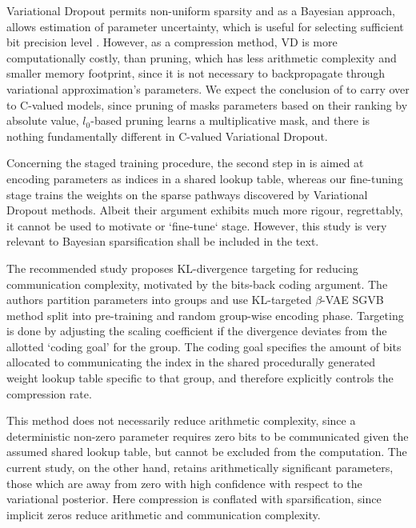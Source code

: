 \documentclass[10pt,a4paper,draft]{article}
\begin{document}
Variational Dropout permits non-uniform sparsity and as a Bayesian approach, allows estimation
of parameter uncertainty, which is useful for selecting sufficient bit precision level
\cite{louizos_bayesian_2017}. However, as a compression method, VD is more computationally
costly, than pruning, which has less arithmetic complexity and smaller memory footprint,
since it is not necessary to backpropagate through variational approximation's parameters.
We expect the conclusion of \cite{gale_state_2019} to carry over to C-valued models, since
pruning of \cite{zhu_prune_2018} masks parameters based on their ranking by absolute value,
$l_0$-based pruning \cite{louizos_learning_2018} learns a multiplicative mask, and there is
nothing fundamentally different in C-valued Variational Dropout.

Concerning the staged training procedure, the second step in
\cite{havasi_minimal_2018}
is aimed at encoding parameters as indices in a shared lookup table, whereas our fine-tuning
stage trains the weights on the sparse pathways discovered by Variational Dropout methods.
Albeit their argument exhibits much more rigour, regrettably, it cannot be used to motivate
or `fine-tune` stage. However, this study is very relevant to Bayesian sparsification shall
be included in the text.

The recommended study \cite{havasi_minimal_2018} proposes KL-divergence targeting for reducing
communication complexity, motivated by the bits-back coding argument. The authors partition
parameters into groups and use KL-targeted $\beta$-VAE SGVB method split into pre-training
and random group-wise encoding phase. Targeting is done by adjusting the scaling coefficient
if the divergence deviates from the allotted `coding goal' for the group. The coding goal
specifies the amount of bits allocated to communicating the index in the shared procedurally
generated weight lookup table specific to that group, and therefore explicitly controls the
compression rate.

This method does not necessarily reduce arithmetic complexity, since a deterministic
non-zero parameter requires zero bits to be communicated given the assumed shared lookup
table, but cannot be excluded from the computation. The current study, on the other hand,
retains arithmetically significant parameters, those which are away from zero with high
confidence with respect to the variational posterior. Here compression is conflated with
sparsification, since implicit zeros reduce arithmetic and communication complexity.
\end{document}
